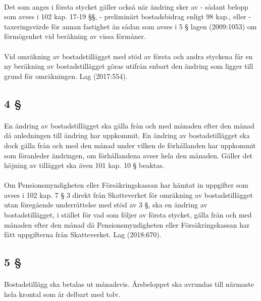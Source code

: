 \documentclass[a4paper,notitlepage,openany,10pt]{book}
\begin{document}
\paragraph*{}
Det som anges i första stycket gäller också när ändring sker av
\newline - sådant belopp som avses i 102 kap. 17-19 §§,
\newline - preliminärt bostadsbidrag enligt 98 kap., eller
\newline - taxeringsvärde för annan fastighet än sådan som avses i 5 § lagen (2009:1053) om förmögenhet vid beräkning av vissa förmåner.
\paragraph*{}
Vid omräkning av bostadstillägget med stöd av första och andra styckena får en ny beräkning av bostadstillägget göras utifrån enbart den ändring som ligger till grund för omräkningen.
Lag (2017:554).
\subsection*{4 §}
\paragraph*{}
En ändring av bostadstillägget ska gälla från och med månaden efter den månad då anledningen till ändring har uppkommit. En ändring av bostadstillägget ska dock gälla från och med den månad under vilken de förhållanden har uppkommit som föranleder ändringen, om förhållandena avser hela den månaden. Gäller det höjning av tillägget ska även 101 kap. 10 § beaktas.
\paragraph*{}
Om Pensionsmyndigheten eller Försäkringskassan har hämtat in uppgifter som avses i 102 kap. 7 § 3 direkt från Skatteverket för omräkning av bostadstillägget utan föregående underrättelse med stöd av 3 §, ska en ändring av bostadstillägget, i stället för vad som följer av första stycket, gälla från och med månaden efter den månad då Pensionsmyndigheten eller Försäkringskassan har fått uppgifterna från Skatteverket.
Lag (2018:670).
\subsection*{5 §}
\paragraph*{}
Bostadstillägg ska betalas ut månadsvis. Årsbeloppet ska avrundas till närmaste hela krontal som är delbart med tolv.
\end{document}
